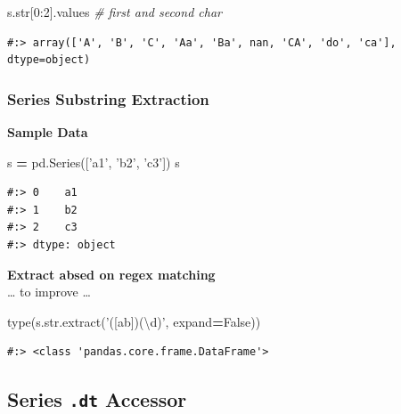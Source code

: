 \documentclass[
]{book}
\newenvironment{Shaded}{\begin{snugshade}}{\end{snugshade}}
\newcommand{\BuiltInTok}[1]{#1}
\newcommand{\CommentTok}[1]{\textcolor[rgb]{0.37,0.37,0.37}{\textit{#1}}}
\newcommand{\DecValTok}[1]{\textcolor[rgb]{0.06,0.06,0.06}{#1}}
\newcommand{\NormalTok}[1]{#1}
\newcommand{\OperatorTok}[1]{\textcolor[rgb]{0.43,0.43,0.43}{\textbf{#1}}}
\newcommand{\StringTok}[1]{\textcolor[rgb]{0.5,0.5,0.5}{#1}}
\newcommand{\VariableTok}[1]{\textcolor[rgb]{0,0,0}{#1}}
\begin{document}
\begin{Shaded}
\begin{Highlighting}[]
\NormalTok{s.}\BuiltInTok{str}\NormalTok{[}\DecValTok{0}\NormalTok{:}\DecValTok{2}\NormalTok{].values  }\CommentTok{# first and second char}
\end{Highlighting}
\end{Shaded}

\begin{verbatim}
#:> array(['A', 'B', 'C', 'Aa', 'Ba', nan, 'CA', 'do', 'ca'], dtype=object)
\end{verbatim}

\hypertarget{series-substring-extraction}{%
\subsubsection{Series Substring Extraction}\label{series-substring-extraction}}

\textbf{Sample Data}

\begin{Shaded}
\begin{Highlighting}[]
\NormalTok{s }\OperatorTok{=}\NormalTok{ pd.Series([}\StringTok{'a1'}\NormalTok{, }\StringTok{'b2'}\NormalTok{, }\StringTok{'c3'}\NormalTok{])}
\NormalTok{s}
\end{Highlighting}
\end{Shaded}

\begin{verbatim}
#:> 0    a1
#:> 1    b2
#:> 2    c3
#:> dtype: object
\end{verbatim}

\textbf{Extract absed on regex matching}\\
\ldots{} to improve \ldots{}

\begin{Shaded}
\begin{Highlighting}[]
\BuiltInTok{type}\NormalTok{(s.}\BuiltInTok{str}\NormalTok{.extract(}\StringTok{'([ab])(\textbackslash{}d)'}\NormalTok{, expand}\OperatorTok{=}\VariableTok{False}\NormalTok{))}
\end{Highlighting}
\end{Shaded}

\begin{verbatim}
#:> <class 'pandas.core.frame.DataFrame'>
\end{verbatim}

\hypertarget{series-.dt-accessor}{%
\subsection{\texorpdfstring{Series \texttt{.dt} Accessor}{Series .dt Accessor}}\label{series-.dt-accessor}}
\end{document}
